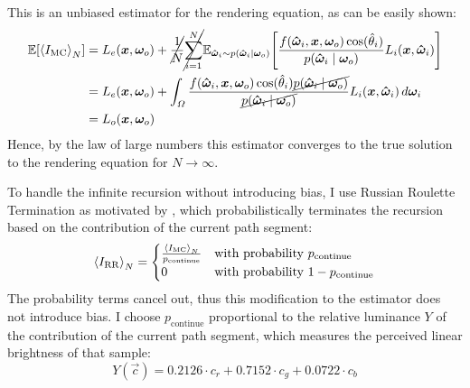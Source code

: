 This is an unbiased estimator for the rendering equation, as can be easily shown:
\begin{equation}
    \begin{aligned}
        \expectation{\estimator{I_\mathrm{MC}}}
        &= L_e(\vec{x}, \wo) + \cancel{\frac{1}{N}} \cancel{\sum_{i=1}^{N}} \expectationvar{\vec{\hat{\omega}}_i \sim p(\vec{\hat{\omega}}_i \mid \wo)}{\frac{f(\vec{\hat{\omega}}_i, \vec{x}, \wo) \cos(\hat{\theta}_i)}{p(\vec{\hat{\omega}}_i \mid \wo)} L_i(\vec{x}, \vec{\hat{\omega}}_i)} \\
        &= L_e(\vec{x}, \wo) + \int_{\Omega} \frac{f(\vec{\hat{\omega}}_i, \vec{x}, \wo) \cos(\hat{\theta}_i) \cancel{p(\vec{\hat{\omega}}_i \mid \wo)}}{\cancel{p(\vec{\hat{\omega}}_i \mid \wo)}} L_i(\vec{x}, \vec{\hat{\omega}}_i) \diff\wi \\
        &= L_o(\vec{x}, \wo)
    \end{aligned}
\end{equation}
Hence, by the law of large numbers this estimator converges to the true solution to the rendering equation for $N \to \infty$.

To handle the infinite recursion without introducing bias, I use Russian Roulette Termination as motivated by \textcite{veach1997}, which probabilistically terminates the recursion based on the contribution of the current path segment:
\begin{equation}
\label{eq:rr}
    \estimator{I_\mathrm{RR}} =
    \begin{cases}
        \frac{\estimator{I_\mathrm{MC}}}{p_\mathrm{continue}} & \text{with probability } p_\mathrm{continue} \\
        0 & \text{with probability } 1 - p_\mathrm{continue}
    \end{cases}
\end{equation}
The probability terms cancel out, thus this modification to the estimator does not introduce bias.
I choose $p_\mathrm{continue}$ proportional to the relative luminance $Y$  of the contribution of the current path segment, which measures the perceived linear brightness of that sample:
\begin{equation}
\label{eq:luminance}
    Y(\vec{c}) = 0.2126 \cdot c_r + 0.7152 \cdot c_g + 0.0722 \cdot c_b
\end{equation}


